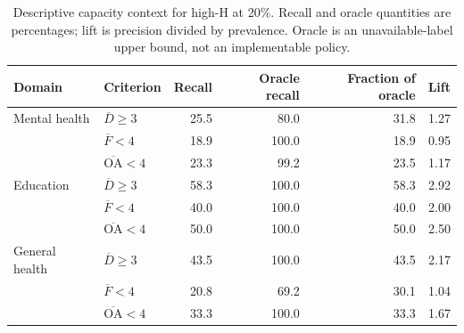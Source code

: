 \begin{table}[htbp]
\centering\small
\caption{Descriptive capacity context for high-H at 20\%. Recall and oracle quantities are percentages; lift is precision divided by prevalence. Oracle is an unavailable-label upper bound, not an implementable policy.}
\label{tab:oracle_context}
\begin{tabular}{llrrrr}
\toprule
Domain & Criterion & Recall & Oracle recall & Fraction of oracle & Lift \\
\midrule
Mental health & $\overline D\geq3$ & 25.5 & 80.0 & 31.8 & 1.27 \\
 & $\overline F<4$ & 18.9 & 100.0 & 18.9 & 0.95 \\
 & $\overline{\mathrm{OA}}<4$ & 23.3 & 99.2 & 23.5 & 1.17 \\
Education & $\overline D\geq3$ & 58.3 & 100.0 & 58.3 & 2.92 \\
 & $\overline F<4$ & 40.0 & 100.0 & 40.0 & 2.00 \\
 & $\overline{\mathrm{OA}}<4$ & 50.0 & 100.0 & 50.0 & 2.50 \\
General health & $\overline D\geq3$ & 43.5 & 100.0 & 43.5 & 2.17 \\
 & $\overline F<4$ & 20.8 & 69.2 & 30.1 & 1.04 \\
 & $\overline{\mathrm{OA}}<4$ & 33.3 & 100.0 & 33.3 & 1.67 \\
\bottomrule
\end{tabular}
\end{table}
